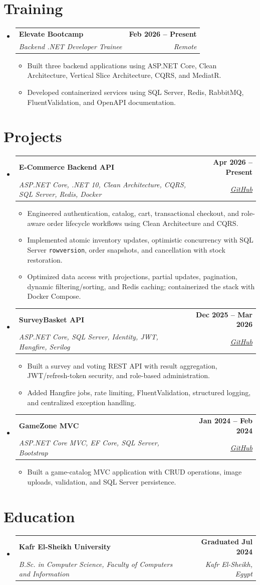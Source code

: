 \documentclass[a4paper,10pt]{article}
\newcommand{\resumeItem}[1]{\item\small{#1}}
\newcommand{\resumeSubheading}[4]{
  \vspace{-2pt}\item
  \begin{tabularx}{0.98\textwidth}[t]{
    >{\raggedright\arraybackslash}X
    >{\raggedleft\arraybackslash}r
  }
    \textbf{#1} & \textbf{\small #2} \\
    \textit{\small #3} & \textit{\small #4}
  \end{tabularx}
  \vspace{-8pt}
}
\newcommand{\resumeSubHeadingListStart}{
  \begin{itemize}[leftmargin=0.12in,label={},itemsep=0pt,topsep=1pt]
}
\newcommand{\resumeSubHeadingListEnd}{\end{itemize}\vspace{-3pt}}
\newcommand{\resumeItemListStart}{
  \begin{itemize}[leftmargin=0.20in,label=\textbullet,itemsep=0pt,topsep=2pt,parsep=0pt]
}
\newcommand{\resumeItemListEnd}{\end{itemize}\vspace{-5pt}}
\begin{document}
\section{Training}
\resumeSubHeadingListStart
  \resumeSubheading
    {Elevate Bootcamp}{Feb 2026 -- Present}
    {Backend .NET Developer Trainee}{Remote}
  \resumeItemListStart
    \resumeItem{Built three backend applications using ASP.NET Core, Clean Architecture, Vertical Slice Architecture, CQRS, and MediatR.}
    \resumeItem{Developed containerized services using SQL Server, Redis, RabbitMQ, FluentValidation, and OpenAPI documentation.}
  \resumeItemListEnd
\resumeSubHeadingListEnd

\section{Projects}
\resumeSubHeadingListStart
  \resumeSubheading
    {E-Commerce Backend API}{Apr 2026 -- Present}
    {ASP.NET Core, .NET 10, Clean Architecture, CQRS, SQL Server, Redis, Docker}
    {\href{https://github.com/Muhammad-As3d/ECommerce}{GitHub}}
  \resumeItemListStart
    \resumeItem{Engineered authentication, catalog, cart, transactional checkout, and role-aware order lifecycle workflows using Clean Architecture and CQRS.}
    \resumeItem{Implemented atomic inventory updates, optimistic concurrency with SQL Server \texttt{rowversion}, order snapshots, and cancellation with stock restoration.}
    \resumeItem{Optimized data access with projections, partial updates, pagination, dynamic filtering/sorting, and Redis caching; containerized the stack with Docker Compose.}
  \resumeItemListEnd

  \resumeSubheading
    {SurveyBasket API}{Dec 2025 -- Mar 2026}
    {ASP.NET Core, SQL Server, Identity, JWT, Hangfire, Serilog}
    {\href{https://github.com/Muhammad-As3d/SurveyBasket}{GitHub}}
  \resumeItemListStart
    \resumeItem{Built a survey and voting REST API with result aggregation, JWT/refresh-token security, and role-based administration.}
    \resumeItem{Added Hangfire jobs, rate limiting, FluentValidation, structured logging, and centralized exception handling.}
  \resumeItemListEnd

  \resumeSubheading
    {GameZone MVC}{Jan 2024 -- Feb 2024}
    {ASP.NET Core MVC, EF Core, SQL Server, Bootstrap}
    {\href{https://github.com/Muhammad-As3d/GameZone}{GitHub}}
  \resumeItemListStart
    \resumeItem{Built a game-catalog MVC application with CRUD operations, image uploads, validation, and SQL Server persistence.}
  \resumeItemListEnd
\resumeSubHeadingListEnd

\section{Education}
\resumeSubHeadingListStart
  \resumeSubheading
    {Kafr El-Sheikh University}{Graduated Jul 2024}
    {B.Sc. in Computer Science, Faculty of Computers and Information}
    {Kafr El-Sheikh, Egypt}
\resumeSubHeadingListEnd
\end{document}
